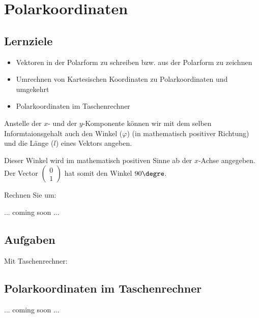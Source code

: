 
\section{Polarkoordinaten}

\subsection*{Lernziele}
\begin{itemize}
\item Vektoren in der Polarform zu schreiben bzw. aus der Polarform zu
  zeichnen
\item Umrechnen von Kartesischen Koordinaten zu Polarkoordinaten und
  umgekehrt
\item Polarkoordinaten im Taschenrechner
\end{itemize}

Anstelle der $x$- und der $y$-Komponente können wir mit dem selben
Informtaionsgehalt auch den Winkel ($\varphi$)
(in mathematisch positiver Richtung) und die Länge ($l$) eines Vektors
angeben.


Dieser Winkel wird im mathematisch positiven Sinne ab der $x$-Achse
angegeben. Der Vector
$\begin{pmatrix}0\\1\end{pmatrix}$ hat somit den Winkel $90\degre$.

Rechnen Sie um:

... coming soon ...

\subsection*{Aufgaben}

Mit Taschenrechner:



\subsection{Polarkoordinaten im Taschenrechner}

... coming soon ...
